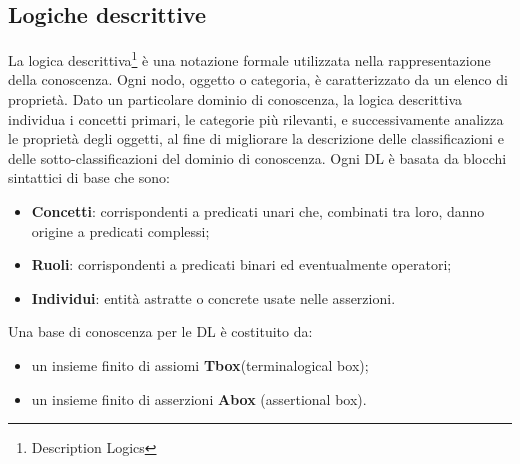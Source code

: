\documentclass[a4paper,11pt]{article}
\begin{document}
\newpage

\subsection{Logiche descrittive}
\label{sec:2.3}

La logica descrittiva\cite{DLHANDBOOK2}\footnote{Description Logics} è una
notazione formale utilizzata nella rappresentazione della conoscenza. Ogni nodo, oggetto o categoria, è caratterizzato da un elenco di proprietà.
Dato un particolare dominio di conoscenza, la logica descrittiva individua i concetti primari, le categorie più rilevanti, e successivamente analizza le proprietà degli oggetti, al fine di migliorare la descrizione delle classificazioni e delle sotto-classificazioni del dominio di conoscenza. Ogni DL è basata da blocchi sintattici di base che sono:
\begin{itemize}
\item \textbf{Concetti}: corrispondenti a predicati unari che, combinati tra loro, danno origine a predicati complessi; 
\item \textbf{Ruoli}: corrispondenti a predicati binari ed eventualmente operatori;
\item \textbf{Individui}: entità astratte o concrete usate nelle asserzioni.
\end{itemize}
Una base di conoscenza per le DL è costituito da:
\begin{itemize}
\item un insieme finito di assiomi \textbf{Tbox}(terminalogical box);
\item un insieme finito di asserzioni \textbf{Abox} (assertional box).
\end{itemize}
\end{document}
